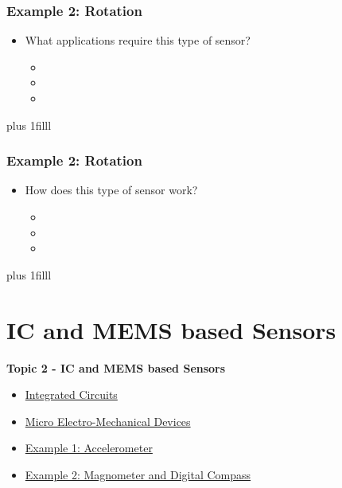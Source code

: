 \documentclass[fleqn]{beamer} %
\newcommand{\sectionIItitle}{IC and MEMS based Sensors}
\newcommand{\sectionIsubsectionIIItitle}{Example 2: Rotation}
\newcommand{\sectionIIsubsectionItitle}{Integrated Circuits}
\newcommand{\sectionIIsubsectionIItitle}{Micro Electro-Mechanical Devices}
\newcommand{\sectionIIsubsectionIIItitle}{Example 1: Accelerometer}
\newcommand{\sectionIIsubsectionIVtitle}{Example 2: Magnometer and Digital Compass}
\newcommand{\btVFill}{\vskip0pt plus 1filll}
\begin{document}
			\begin{frame}
				\frametitle{\sectionIsubsectionIIItitle}

				\begin{itemize}
					\item What applications require this type of sensor?
					\begin{itemize}
						\item \vspace{5mm}
						\item \vspace{5mm}
						\item \vspace{5mm}	
					\end{itemize}
				\end{itemize}

				\btVFill

			\end{frame}


			\begin{frame}
				\frametitle{\sectionIsubsectionIIItitle}

				\begin{itemize}
					\item How does this type of sensor work?
					\begin{itemize}
						\item \vspace{5mm}
						\item \vspace{5mm}
						\item \vspace{5mm}	
					\end{itemize}
				\end{itemize}
				
				\btVFill

			\end{frame}	

	
	\section{\sectionIItitle}\label{sectionII}

		\begin{frame}
			\large \textbf{Topic 2 - \sectionIItitle} \vspace{3mm}\\

			\begin{itemize}
				\item \hyperlink{sectionIIsubsectionI}{\sectionIIsubsectionItitle} \vspc %
				\item \hyperlink{sectionIIsubsectionII}{\sectionIIsubsectionIItitle} \vspc %
				\item \hyperlink{sectionIIsubsectionIII}{\sectionIIsubsectionIIItitle} \vspc %
				\item \hyperlink{sectionIIsubsectionIV}{\sectionIIsubsectionIVtitle} \vspc %
			\end{itemize}

		\end{frame}
\end{document}
